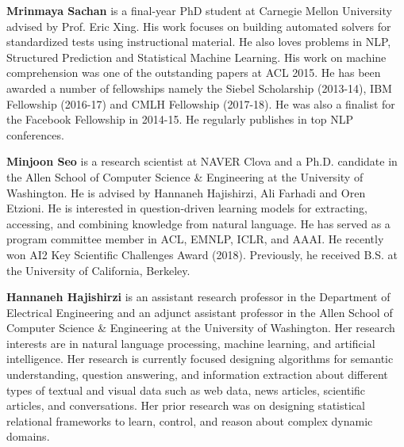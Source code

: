 \begin{bio}

\textbf{Mrinmaya Sachan} is a final-year PhD student at
Carnegie Mellon University advised by Prof. Eric
Xing. His work focuses on building automated
solvers for standardized tests using instructional
material. He also loves problems in NLP, Structured
Prediction and Statistical Machine Learning.
His work on machine comprehension was
one of the outstanding papers at ACL 2015. He
has been awarded a number of fellowships namely
the Siebel Scholarship (2013-14), IBM Fellowship
(2016-17) and CMLH Fellowship (2017-18).
He was also a finalist for the Facebook Fellowship
in 2014-15. He regularly publishes in top
NLP conferences. 

\textbf{Minjoon Seo} is a research scientist at NAVER
Clova and a Ph.D. candidate in the Allen School
of Computer Science \& Engineering at the University
of Washington. He is advised by Hannaneh
Hajishirzi, Ali Farhadi and Oren Etzioni. He is
interested in question-driven learning models for
extracting, accessing, and combining knowledge
from natural language. He has served as a program
committee member in ACL, EMNLP, ICLR, and
AAAI. He recently won AI2 Key Scientific Challenges
Award (2018). Previously, he received B.S.
at the University of California, Berkeley. 

\textbf{Hannaneh Hajishirzi} is an assistant research professor
in the Department of Electrical Engineering
and an adjunct assistant professor in the Allen
School of Computer Science \& Engineering at the
University of Washington. Her research interests
are in natural language processing, machine learning,
and artificial intelligence. Her research is currently
focused designing algorithms for semantic
understanding, question answering, and information
extraction about different types of textual and
visual data such as web data, news articles, scientific
articles, and conversations. Her prior research
was on designing statistical relational frameworks
to learn, control, and reason about complex dynamic
domains. 


\end{bio}
